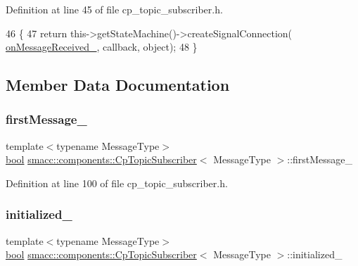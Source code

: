 Definition at line 45 of file cp\+\_\+topic\+\_\+subscriber.\+h.


\begin{DoxyCode}
46     \{
47         \textcolor{keywordflow}{return} this->getStateMachine()->createSignalConnection(
      \hyperlink{classsmacc_1_1components_1_1CpTopicSubscriber_aeec04e64cad880bd49d401c2a474c6e9}{onMessageReceived\_}, callback, \textcolor{keywordtype}{object});
48     \}
\end{DoxyCode}


\subsection{Member Data Documentation}
\mbox{\label{classsmacc_1_1components_1_1CpTopicSubscriber_aadbaf8c0f0a2a5bea38f41356528f41c}} 
\subsubsection{\texorpdfstring{first\+Message\+\_\+}{firstMessage\_}}
{\footnotesize\ttfamily template$<$typename Message\+Type$>$ \\
\hyperlink{classbool}{bool} \hyperlink{classsmacc_1_1components_1_1CpTopicSubscriber}{smacc\+::components\+::\+Cp\+Topic\+Subscriber}$<$ Message\+Type $>$\+::first\+Message\+\_\+\hspace{0.3cm}{\ttfamily [private]}}



Definition at line 100 of file cp\+\_\+topic\+\_\+subscriber.\+h.

\mbox{\label{classsmacc_1_1components_1_1CpTopicSubscriber_a666e60629820ef146ade691a36c41e0a}} 
\subsubsection{\texorpdfstring{initialized\+\_\+}{initialized\_}}
{\footnotesize\ttfamily template$<$typename Message\+Type$>$ \\
\hyperlink{classbool}{bool} \hyperlink{classsmacc_1_1components_1_1CpTopicSubscriber}{smacc\+::components\+::\+Cp\+Topic\+Subscriber}$<$ Message\+Type $>$\+::initialized\+\_\+\hspace{0.3cm}{\ttfamily [private]}}



